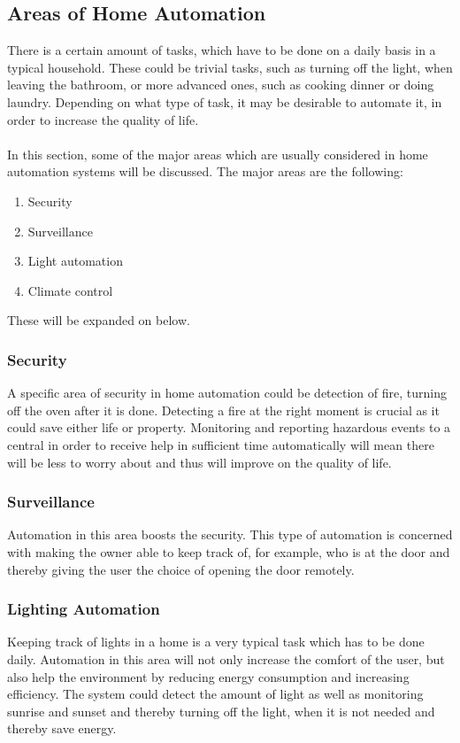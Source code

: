 \subsection{Areas of Home Automation}
\label{sec:Areas of Home Automation}
There is a certain amount of tasks, which have to be done on a daily basis in a typical household. These could be trivial tasks, such as turning off the light, when leaving the bathroom, or more advanced ones, such as cooking dinner or doing laundry. Depending on what type of task, it may be desirable to automate it, in order to increase the quality of life.
\\\\
In this section, some of the major areas which are usually considered in home automation systems will be discussed.
The major areas are the following:
\begin{enumerate}
  \item Security
  \item Surveillance
  \item Light automation
  \item Climate control
\end{enumerate}
These will be expanded on below.

\subsubsection{Security}
\label{sub:Security}
A specific area of security in home automation could be detection of fire, turning off the oven after it is done. Detecting a fire at the right moment is crucial as it could save either life or property. Monitoring and reporting hazardous events to a central in order to receive help in sufficient time automatically will mean there will be less to worry about and thus will improve on the quality of life.

\subsubsection{Surveillance}
\label{sub:Surveillance}
Automation in this area boosts the security. This type of automation is concerned with making the owner able to keep track of, for example, who is at the door and thereby giving the user the choice of opening the door remotely.

\subsubsection{Lighting Automation}
\label{sub:Lighting Automation}
Keeping track of lights in a home is a very typical task which has to be done daily. Automation in this area will not only increase the comfort of the user, but also help the environment by reducing energy consumption and increasing efficiency. The system could detect the amount of light as well as monitoring sunrise and sunset and thereby turning off the light, when it is not needed and thereby save energy.

